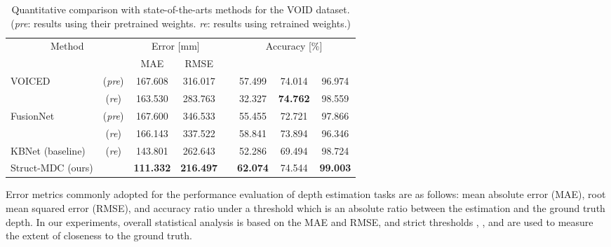 \begin{table}[t]
\centering
\renewcommand{\arraystretch}{1.10} \renewcommand{\tabcolsep}{0.8mm}  \caption{Quantitative comparison with state-of-the-arts \textcolor{color1}{methods} for the VOID \textcolor{color1}{dataset}. 
(\textit{pre}: results using their pretrained weights. 
\textit{re}: results using retrained weights.)
}

\begin{tabular}{lccccccc}
\hline
\multicolumn{2}{c}{\multirow{2}{*}{Method}} & \multicolumn{2}{c}{Error {[}mm{]} } &  & \multicolumn{3}{c}{Accuracy {[}\%{]} }    \\ \cline{3-4} \cline{6-8} 
\multicolumn{2}{c}{}                        & MAE                    & RMSE                   &  &       &       &       \\ \hline
\multirow{2}{*}{\textcolor{color2}{VOICED~\cite{void}}}             & (\textit{pre}) & 167.608                & 316.017                &  & 57.499          & 74.014          & 96.974          \\
                                    & (\textit{re})  & 163.530                & 283.763                &  & 32.327          & \textbf{74.762} & 98.559          \\
\multirow{2}{*}{\textcolor{color2}{FusionNet~\cite{learning_top}}} & (\textit{pre}) & 167.600                & 346.533                &  & 55.455          & 72.721          & 97.866          \\
                                    & (\textit{re})  & 166.143                & 337.522                &  & 58.841          & 73.894          & 96.346          \\
\textcolor{color2}{KBNet (baseline)~\cite{baseline}}                    & (\textit{re})  & 143.801                & 262.643                &  & 52.286          & 69.494          & 98.724          \\
Struct-MDC (ours)                                &       & \textbf{111.332}       & \textbf{216.497}       &  & \textbf{62.074} & 74.544          & \textbf{99.003} \\ \hline
\end{tabular}
\label{table:exp_void}
\end{table}


Error metrics commonly \textcolor{color1}{adopted} for \textcolor{color1}{the} performance evaluation of depth estimation tasks \cite{baseline, error_metric3} are as follows: mean absolute error (MAE), root mean squared error (RMSE), and accuracy ratio under a threshold  which is an absolute ratio between the estimation and the ground truth depth. 
In our experiments, overall statistic\textcolor{color1}{al analysis is based on} the MAE and RMSE, and strict thresholds , \textcolor{color1}{, and}  are used to measure the extent of close\textcolor{color1}{ness} to the ground truth.

